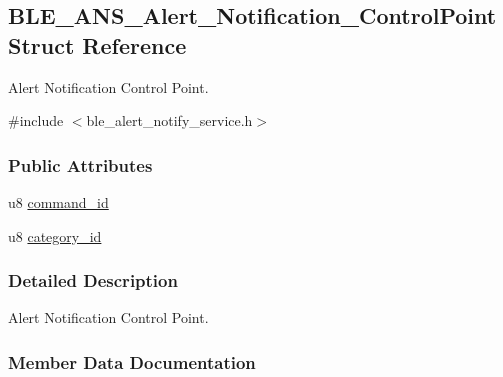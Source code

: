 \hypertarget{struct_b_l_e___a_n_s___alert___notification___control_point}{}\subsection{B\+L\+E\+\_\+\+A\+N\+S\+\_\+\+Alert\+\_\+\+Notification\+\_\+\+Control\+Point Struct Reference}
\label{struct_b_l_e___a_n_s___alert___notification___control_point}


Alert Notification Control Point.  




{\ttfamily \#include $<$ble\+\_\+alert\+\_\+notify\+\_\+service.\+h$>$}

\subsubsection*{Public Attributes}
\begin{DoxyCompactItemize}
\item 
u8 \hyperlink{struct_b_l_e___a_n_s___alert___notification___control_point_a1cc88b9e0767f9a2ad4ba67108986fe4}{command\+\_\+id}
\item 
u8 \hyperlink{struct_b_l_e___a_n_s___alert___notification___control_point_ab0413aee1f9150d1ee542a5a1ae73517}{category\+\_\+id}
\end{DoxyCompactItemize}


\subsubsection{Detailed Description}
Alert Notification Control Point. 

\subsubsection{Member Data Documentation}
